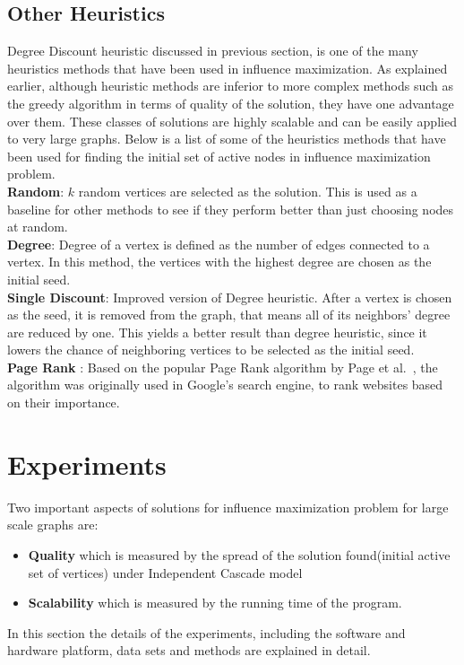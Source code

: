 \documentclass[english]{tktltiki}
\begin{document}
\subsection{Other Heuristics}
Degree Discount heuristic discussed in previous section, is one of the many heuristics methods that have been used in influence maximization. As explained earlier, although heuristic methods are inferior to more complex methods such as the greedy algorithm in terms of quality of the solution, they have one advantage over them. These classes of solutions are highly scalable and can be easily applied to very large graphs. Below is a list of some of the heuristics methods that have been used for finding the initial set of active nodes in influence maximization problem. \\
\textbf{Random}: $k$ random vertices are selected as the solution. This is used as a baseline for other methods to see if they perform better than just choosing nodes at random. \\
\textbf{Degree}: Degree of a vertex is defined as the number of edges connected to a vertex. In this method, the vertices with the highest degree are chosen as the initial seed. \\ 
\textbf{Single Discount}: Improved version of Degree heuristic. After a vertex is chosen as the seed, it is removed from the graph, that means all of its neighbors' degree are reduced by one. This yields a better result than degree heuristic, since it lowers the chance of neighboring vertices to be selected as the initial seed. \\ 
\textbf {Page Rank} : Based on the popular Page Rank algorithm by Page et al.\ \cite{page98}, the algorithm was originally used in Google's search engine, to rank websites based on their importance. 
\newpage


\section{Experiments}
\label{sec:experiments}
Two important aspects of solutions for influence maximization problem for large scale graphs are:
\begin{itemize}
\item \textbf{Quality} which is measured by the spread of the solution found(initial active set of vertices) under Independent Cascade model
\item \textbf{Scalability} which is measured by the running time of the program. 
\end{itemize}
In this section the details of the experiments, including the software and hardware platform, data sets and methods are explained in detail.
\end{document}
